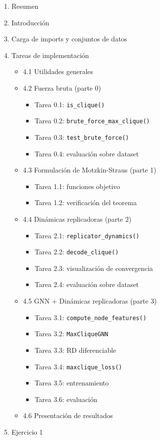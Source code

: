 \documentclass[11pt]{article}
\providecommand{\tightlist}{%
      \setlength{\itemsep}{0pt}\setlength{\parskip}{0pt}}
\begin{document}
\begin{enumerate}
\def\labelenumi{\arabic{enumi}.}
\tightlist
\item
  Resumen
\item
  Introducción
\item
  Carga de imports y conjuntos de datos
\item
  Tareas de implementación

  \begin{itemize}
  \tightlist
  \item
    4.1 Utilidades generales
  \item
    4.2 Fuerza bruta (parte 0)

    \begin{itemize}
    \tightlist
    \item
      Tarea 0.1: \texttt{is\_clique()}
    \item
      Tarea 0.2: \texttt{brute\_force\_max\_clique()}
    \item
      Tarea 0.3: \texttt{test\_brute\_force()}
    \item
      Tarea 0.4: evaluación sobre dataset
    \end{itemize}
  \item
    4.3 Formulación de Motzkin-Straus (parte 1)

    \begin{itemize}
    \tightlist
    \item
      Tarea 1.1: funciones objetivo
    \item
      Tarea 1.2: verificación del teorema
    \end{itemize}
  \item
    4.4 Dinámicas replicadoras (parte 2)

    \begin{itemize}
    \tightlist
    \item
      Tarea 2.1: \texttt{replicator\_dynamics()}
    \item
      Tarea 2.2: \texttt{decode\_clique()}
    \item
      Tarea 2.3: visualización de convergencia
    \item
      Tarea 2.4: evaluación sobre dataset
    \end{itemize}
  \item
    4.5 GNN + Dinámicas replicadoras (parte 3)

    \begin{itemize}
    \tightlist
    \item
      Tarea 3.1: \texttt{compute\_node\_features()}
    \item
      Tarea 3.2: \texttt{MaxCliqueGNN}
    \item
      Tarea 3.3: RD diferenciable
    \item
      Tarea 3.4: \texttt{maxclique\_loss()}
    \item
      Tarea 3.5: entrenamiento
    \item
      Tarea 3.6: evaluación
    \end{itemize}
  \item
    4.6 Presentación de resultados
  \end{itemize}
\item
  Ejercicio 1


\end{enumerate}
\end{document}
